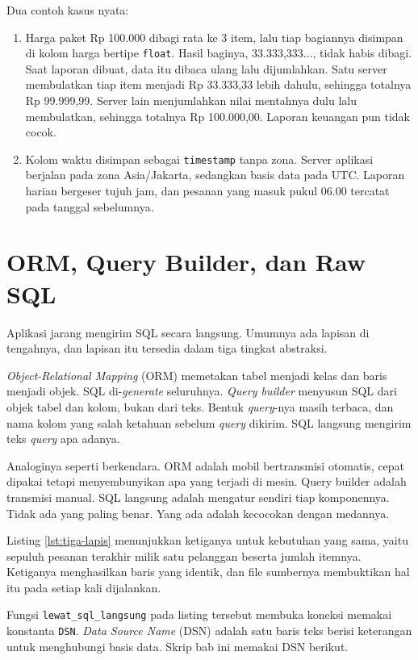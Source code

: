 Dua contoh kasus nyata:

\begin{enumerate}
  \item Harga paket Rp 100.000 dibagi rata ke 3 item, lalu tiap bagiannya
        disimpan di kolom harga bertipe \texttt{float}. Hasil baginya,
        33.333,333..., tidak habis dibagi. Saat laporan dibuat, data itu
        dibaca ulang lalu dijumlahkan. Satu server membulatkan tiap item
        menjadi Rp 33.333,33 lebih dahulu, sehingga totalnya Rp 99.999,99.
        Server lain menjumlahkan nilai mentahnya dulu lalu membulatkan,
        sehingga totalnya Rp 100.000,00. Laporan keuangan pun tidak cocok.
  \item Kolom waktu disimpan sebagai \texttt{timestamp} tanpa zona. Server
        aplikasi berjalan pada zona Asia/Jakarta, sedangkan basis data pada UTC.
        Laporan harian bergeser tujuh jam, dan pesanan yang masuk pukul 06.00
        tercatat pada tanggal sebelumnya.
\end{enumerate}

\section{ORM, Query Builder, dan Raw SQL}

Aplikasi jarang mengirim SQL secara langsung. Umumnya ada lapisan di
tengahnya, dan lapisan itu tersedia dalam tiga tingkat abstraksi.

\textit{Object-Relational Mapping} (ORM) memetakan tabel menjadi kelas dan
baris menjadi objek. SQL di-\textit{generate} seluruhnya. \textit{Query builder}
menyusun SQL dari objek tabel dan kolom, bukan dari teks. Bentuk \textit{query}-nya masih
terbaca, dan nama kolom yang salah ketahuan sebelum \textit{query} dikirim. SQL langsung
mengirim teks \textit{query} apa adanya.

Analoginya seperti berkendara. ORM adalah mobil bertransmisi otomatis, cepat
dipakai tetapi menyembunyikan apa yang terjadi di mesin. Query builder adalah
transmisi manual. SQL langsung adalah mengatur sendiri tiap komponennya. Tidak
ada yang paling benar. Yang ada adalah kecocokan dengan medannya.

Listing \ref{lst:tiga-lapis} menunjukkan ketiganya untuk kebutuhan yang sama,
yaitu sepuluh pesanan terakhir milik satu pelanggan beserta jumlah itemnya.
Ketiganya menghasilkan baris yang identik, dan file sumbernya membuktikan hal
itu pada setiap kali dijalankan.

Fungsi \texttt{lewat\_sql\_langsung} pada listing tersebut membuka koneksi
memakai konstanta \texttt{DSN}. \textit{Data Source Name} (DSN) adalah satu
baris teks berisi keterangan untuk menghubungi basis data. Skrip bab ini
memakai DSN berikut.

